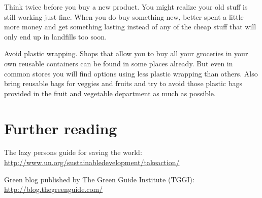 \begin{suggest}{Think twice before you buy a new product.}
	You might realize your old stuff is still working just fine. When you do buy something new, better spent a little more money and get something lasting instead of any of the cheap stuff that will only end up in landfills too soon. 
\end{suggest} 

\begin{suggest}{Avoid plastic wrapping.}
	Shops that allow you to buy all your groceries in your own reusable containers can be found in some places already. But even in common stores you will find options using less plastic wrapping than others. Also bring reusable bags for veggies and fruits and try to avoid those plastic bags provided in the fruit and vegetable department as much as possible.
\end{suggest}


\section{Further reading} 

\begin{suggest}{The lazy persons guide for saving the world:} 
\url{http://www.un.org/sustainabledevelopment/takeaction/}
\end{suggest}

\begin{suggest}{Green blog published by The Green Guide Institute (TGGI):}
\url{http://blog.thegreenguide.com/}
\end{suggest}
